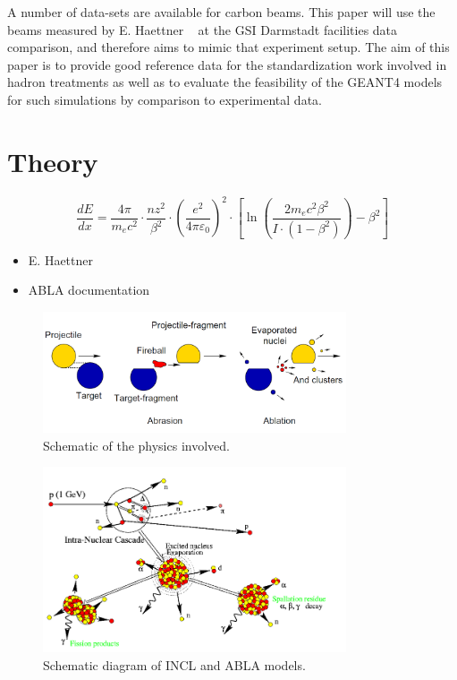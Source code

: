 A number of data-sets are available for carbon beams. This paper will use the beams measured by E. Haettner ~\cite{ehaettner}  at the GSI Darmstadt facilities data comparison, and therefore aims to mimic that experiment setup. The aim of this paper is  to provide good reference data for the standardization work involved in hadron treatments as well as to evaluate the feasibility of the GEANT4 models for such simulations by comparison to experimental data.

\section{Theory}
\begin{equation}
 \frac{dE}{dx} = \frac{4 \pi}{m_e c^2} \cdot \frac{nz^2}{\beta^2} \cdot \left(\frac{e^2}{4\pi\varepsilon_0}\right)^2 \cdot \left[\ln \left(\frac{2m_e c^2 \beta^2}{I \cdot (1-\beta^2)}\right) - \beta^2\right]
\label{bethebloch}
\end{equation}


\begin{itemize}
 \item E. Haettner
 \item ABLA documentation
\end{itemize}
\begin{figure}
\begin{center}
\includegraphics[width=0.8\textwidth]{images/ablationabration.png}  
\caption{Schematic of the physics involved.}
 \label{fig:ablationabration}
 \end{center}
 \end{figure}
\begin{figure} 
\begin{center}
\includegraphics[width=0.8\textwidth]{images/inclScematic.png}  
\caption{\label{fig:inclschematic} Schematic diagram of INCL and ABLA models.}
 
 \end{center}
 \end{figure}


